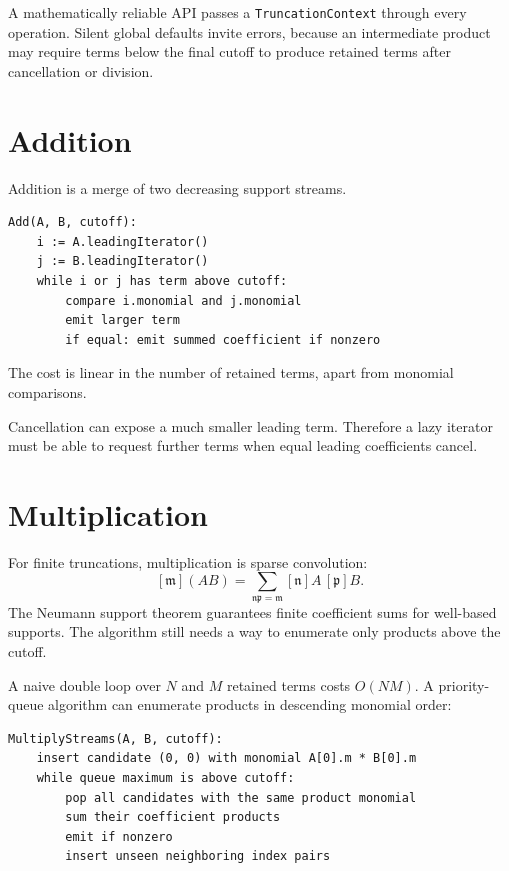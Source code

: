 \documentclass[11pt,openany]{book}
\theoremstyle{definition}
\theoremstyle{plain}
\theoremstyle{remark}
\newcommand{\m}{\mathfrak{m}}
\newcommand{\n}{\mathfrak{n}}
\begin{document}
A mathematically reliable API passes a \texttt{TruncationContext} through every operation. Silent global defaults invite errors, because an intermediate product may require terms below the final cutoff to produce retained terms after cancellation or division.

\section{Addition}

Addition is a merge of two decreasing support streams.

\begin{lstlisting}[style=pseudo]
Add(A, B, cutoff):
    i := A.leadingIterator()
    j := B.leadingIterator()
    while i or j has term above cutoff:
        compare i.monomial and j.monomial
        emit larger term
        if equal: emit summed coefficient if nonzero
\end{lstlisting}

The cost is linear in the number of retained terms, apart from monomial comparisons.

Cancellation can expose a much smaller leading term. Therefore a lazy iterator must be able to request further terms when equal leading coefficients cancel.

\section{Multiplication}

For finite truncations, multiplication is sparse convolution:
\begin{equation}\label{eq:sparse-product}
 [\m](AB)=\sum_{\n\mathfrak p=\m}[\n]A\,[\mathfrak p]B.
\end{equation}
The Neumann support theorem guarantees finite coefficient sums for well-based supports. The algorithm still needs a way to enumerate only products above the cutoff.

A naive double loop over $N$ and $M$ retained terms costs $O(NM)$. A priority-queue algorithm can enumerate products in descending monomial order:

\begin{lstlisting}[style=pseudo]
MultiplyStreams(A, B, cutoff):
    insert candidate (0, 0) with monomial A[0].m * B[0].m
    while queue maximum is above cutoff:
        pop all candidates with the same product monomial
        sum their coefficient products
        emit if nonzero
        insert unseen neighboring index pairs
\end{lstlisting}
\end{document}
